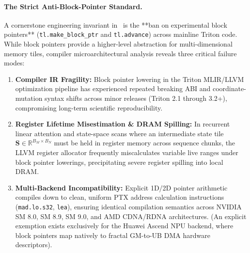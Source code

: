 \paragraph{The Strict Anti-Block-Pointer Standard.}
A cornerstone engineering invariant in \neuralops\ is the **ban on experimental block pointers** (\texttt{tl.make\_block\_ptr} and \texttt{tl.advance}) across mainline Triton code. While block pointers provide a higher-level abstraction for multi-dimensional memory tiles, compiler microarchitectural analysis reveals three critical failure modes:
\begin{enumerate}
    \item \textbf{Compiler IR Fragility:} Block pointer lowering in the Triton MLIR/LLVM optimization pipeline has experienced repeated breaking ABI and coordinate-mutation syntax shifts across minor releases (Triton 2.1 through 3.2+), compromising long-term scientific reproducibility.
    \item \textbf{Register Lifetime Misestimation \& DRAM Spilling:} In recurrent linear attention and state-space scans where an intermediate state tile $\mathbf{S} \in \mathbb{R}^{B_M \times B_N}$ must be held in register memory across sequence chunks, the LLVM register allocator frequently miscalculates variable live ranges under block pointer lowerings, precipitating severe register spilling into local DRAM.
    \item \textbf{Multi-Backend Incompatibility:} Explicit 1D/2D pointer arithmetic compiles down to clean, uniform PTX address calculation instructions (\texttt{mad.lo.s32}, \texttt{lea}), ensuring identical compilation semantics across NVIDIA SM 8.0, SM 8.9, SM 9.0, and AMD CDNA/RDNA architectures. (An explicit exemption exists exclusively for the Huawei Ascend NPU backend, where block pointers map natively to fractal GM-to-UB DMA hardware descriptors).
\end{enumerate}


